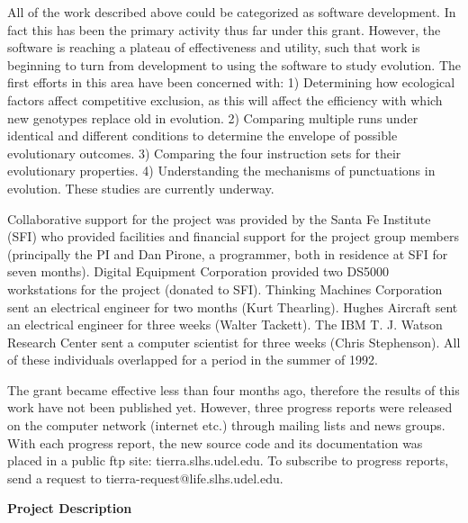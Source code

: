 All of the work described above could be categorized as software development.
In fact this has been the primary activity thus far under this grant.  However,
the software is reaching a plateau of effectiveness and utility, such that
work is beginning to turn from development to using the software to study
evolution.  The first efforts in this area have been concerned with:
1) Determining how ecological factors affect competitive exclusion, as this
will affect the efficiency with which new genotypes replace old in evolution.
2) Comparing multiple runs under identical and different conditions to
determine the envelope of possible evolutionary outcomes.  3) Comparing the
four instruction sets for their evolutionary properties.  4) Understanding
the mechanisms of punctuations in evolution.  These studies are currently
underway.

Collaborative support for the project was provided by the Santa Fe Institute
(SFI) who provided facilities and financial support for the project group
members (principally the PI and Dan Pirone, a programmer, both in residence at
SFI for seven months).  Digital Equipment Corporation provided two DS5000
workstations for the project (donated to SFI).  Thinking Machines Corporation
sent an electrical engineer for two months (Kurt Thearling).  Hughes Aircraft
sent an electrical engineer for three weeks (Walter Tackett).  The IBM T. J.
Watson Research Center sent a computer scientist for three weeks (Chris
Stephenson).  All of these individuals overlapped for a period in the summer
of 1992.

The grant became effective less than four months ago, therefore the results
of this work have not been published yet.  However, three progress reports
were released on the computer network (internet etc.) through mailing lists
and news groups.  With each progress report, the new source code and its
documentation was placed in a public ftp site: tierra.slhs.udel.edu.
To subscribe to progress reports, send a request to
tierra-request@life.slhs.udel.edu.

\newpage

\begin{center}
\large \bf Project Description\rm \normalsize\vspace{12pt}\\
\end{center}

